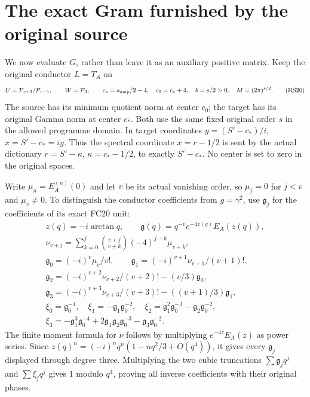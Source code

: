 \documentclass[11pt]{article}
\begin{document}
\section{The exact Gram furnished by the original source}
We now evaluate $G$, rather than leave it as an auxiliary
positive matrix. Keep the original conductor $L=T_A$ on
\begin{equation}
 U=\mathcal P_{v+3}/\mathcal P_{v-1},\qquad
 W=\mathcal P_3,\qquad
 c_*=a_{\rm amp}/2-4,\quad c_0=c_*+4,\quad
 b=s/2>0,\quad M=(2\pi)^{s/2}.
 \tag{RS20}
\end{equation}
The source has its minimum quotient norm at center $c_0$;
the target has its original Gamma norm at center $c_*$.
Both use the same fixed original order $s$ in the allowed
programme domain. In target coordinates
$y=(S'-c_*)/i$, $x=S'-c_*=iy$.
Thus the spectral coordinate $x=r-1/2$ is sent by the actual
dictionary $r=S'-\kappa$, $\kappa=c_*-1/2$, to exactly
$S'-c_*$. No center is set to zero in the original spaces.

Write $\mu_n=E_A^{(n)}(0)$ and let $v$ be its actual
vanishing order, so $\mu_j=0$ for $j<v$ and $\mu_v\ne0$.
To distinguish the conductor coefficients from $g=\gamma^2$,
use $\mathfrak g_j$ for the coefficients of its exact FC20 unit:
\begin{equation}
 \begin{gathered}
 z(q)=-i\arctan q,\qquad
 \mathfrak g(q)=q^{-v}e^{-4z(q)}E_A(z(q)),\\
 \nu_{v+j}=\sum_{k=0}^{j}\binom{v+j}{v+k}(-4)^{j-k}\mu_{v+k},\\
 \mathfrak g_0=(-i)^v\mu_v/v!,\qquad
 \mathfrak g_1=(-i)^{v+1}\nu_{v+1}/(v+1)!,\\
 \mathfrak g_2=(-i)^{v+2}\nu_{v+2}/(v+2)!-(v/3)\mathfrak g_0,\\
 \mathfrak g_3=(-i)^{v+3}\nu_{v+3}/(v+3)!-((v+1)/3)\mathfrak g_1,\\
 \xi_0=\mathfrak g_0^{-1},\quad
 \xi_1=-\mathfrak g_1\mathfrak g_0^{-2},\quad
 \xi_2=\mathfrak g_1^2\mathfrak g_0^{-3}-\mathfrak g_2\mathfrak g_0^{-2},\\
 \xi_3=-\mathfrak g_1^3\mathfrak g_0^{-4}
       +2\mathfrak g_1\mathfrak g_2\mathfrak g_0^{-3}
       -\mathfrak g_3\mathfrak g_0^{-2}.
 \end{gathered}
 \tag{RS21}
\end{equation}
The finite moment formula for $\nu$ follows by multiplying
$e^{-4z}E_A(z)$ as power series. Since
$z(q)^n=(-i)^nq^n(1-nq^2/3+O(q^4))$, it gives every
$\mathfrak g_j$ displayed through degree three. Multiplying
the two cubic truncations $\sum\mathfrak g_jq^j$ and
$\sum\xi_jq^j$ gives $1$ modulo $q^4$, proving all inverse
coefficients with their original phases.
\end{document}

